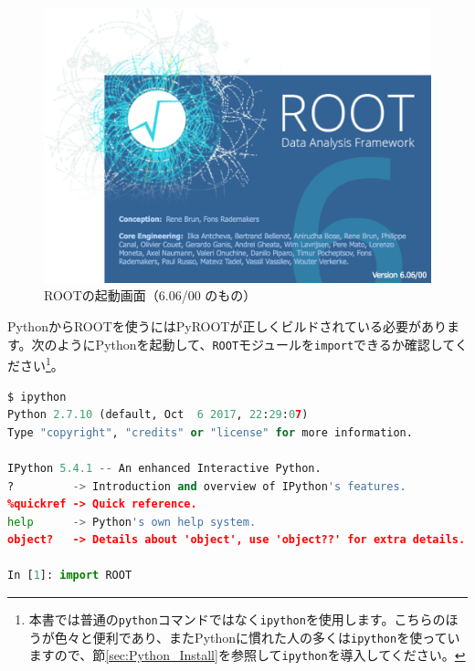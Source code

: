 \begin{figure}
  \centering
  \includegraphics[width=12cm]{fig/splash6.png}
  \caption{ROOTの起動画面（6.06/00 のもの）}
  \label{fig:splash}
\end{figure}

PythonからROOTを使うにはPyROOTが正しくビルドされている必要があります。次のようにPythonを起動して、\texttt{ROOT}モジュールを\texttt{import}できるか確認してください\footnote{本書では普通の\texttt{python}コマンドではなく\texttt{ipython}を使用します。こちらのほうが色々と便利であり、またPythonに慣れた人の多くは\texttt{ipython}を使っていますので、節\ref{sec:Python_Install}を参照して\texttt{ipython}を導入してください。}。
\begin{lstlisting}[language=python]
$ ipython
Python 2.7.10 (default, Oct  6 2017, 22:29:07) 
Type "copyright", "credits" or "license" for more information.

IPython 5.4.1 -- An enhanced Interactive Python.
?         -> Introduction and overview of IPython's features.
%quickref -> Quick reference.
help      -> Python's own help system.
object?   -> Details about 'object', use 'object??' for extra details.

In [1]: import ROOT
\end{lstlisting}

